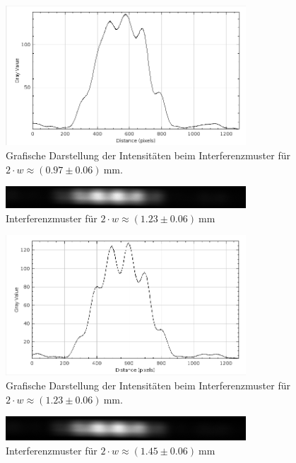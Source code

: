 \documentclass{article}
\begin{document}
\begin{figure}[H]
\centering
\caption{Grafische Darstellung der Intensitäten beim Interferenzmuster für $2\cdot w \approx (0.97\pm0.06)~$mm.}
\includegraphics[width=9cm]{moodle/img5_graph.png}
\end{figure}



\begin{figure}[H]
\centering
\caption{Interferenzmuster für $2\cdot w \approx (1.23\pm0.06)~$mm}
\includegraphics[width=9cm]{moodle/img6.png}
\end{figure}

\begin{figure}[H]
\centering
\caption{Grafische Darstellung der Intensitäten beim Interferenzmuster für $2\cdot w \approx (1.23\pm0.06)~$mm.}
\includegraphics[width=9cm]{moodle/img6_graph.png}
\end{figure}





\begin{figure}[H]
\centering
\caption{Interferenzmuster für $2\cdot w \approx (1.45\pm0.06)~$mm}
\includegraphics[width=9cm]{moodle/img7.png}
\end{figure}
\end{document}
